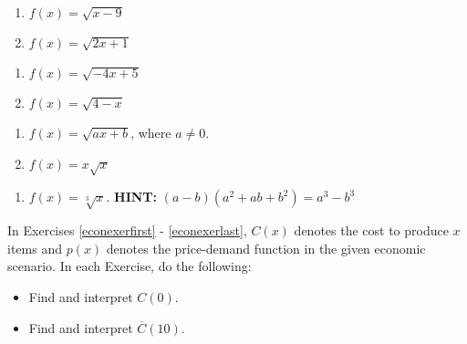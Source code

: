 {\begin{multicols}{2}
\begin{enumerate}
\setcounter{enumi}{\value{HW}}

\item  $f(x) = \sqrt{x-9}$
\item  $f(x) = \sqrt{2x+1}$

\setcounter{HW}{\value{enumi}}
\end{enumerate}
\end{multicols}

\begin{multicols}{2}
\begin{enumerate}
\setcounter{enumi}{\value{HW}}

\item  $f(x) = \sqrt{-4x+5}$
\item  $f(x) = \sqrt{4-x}$

\setcounter{HW}{\value{enumi}}
\end{enumerate}
\end{multicols}

\begin{multicols}{2}
\begin{enumerate}
\setcounter{enumi}{\value{HW}}

\item  $f(x) = \sqrt{ax+b}$, where $a \neq 0$.
\item  $f(x) = x \sqrt{x}$ 

\setcounter{HW}{\value{enumi}}
\end{enumerate}
\end{multicols}

\begin{enumerate}
\setcounter{enumi}{\value{HW}}

\item  $f(x) = \sqrt[3]{x}$.  \textbf{HINT:}  $(a-b)\left(a^2+ab+b^2\right) = a^3 - b^3$  \label{diffquotexerlast}

\setcounter{HW}{\value{enumi}}
\end{enumerate}

In Exercises \ref{econexerfirst} - \ref{econexerlast}, $C(x)$ denotes the cost to produce $x$ items and $p(x)$ denotes the price-demand function in the given economic scenario.  In each Exercise, do the following:

\begin{multicols}{2}
\begin{itemize}

\item  Find and interpret $C(0)$.
\item  Find and interpret $\overline{C}(10)$.


\end{itemize}
\end{multicols}}

